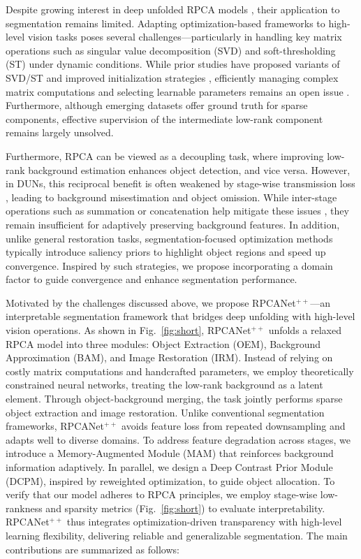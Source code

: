 \documentclass[10pt,journal,compsoc]{IEEEtran}
\begin{document}
Despite growing interest in deep unfolded RPCA models \cite{cai-2021-lrpca}, their application to segmentation remains limited. Adapting optimization-based frameworks to high-level vision tasks poses several challenges—particularly in handling key matrix operations such as singular value decomposition (SVD) and soft-thresholding (ST) under dynamic conditions. While prior studies have proposed variants of SVD/ST and improved initialization strategies \cite{jou-2024-rpca,cai-2021-lrpca}, efficiently managing complex matrix computations and selecting learnable parameters remains an open issue \cite{zhou-2023-lrsp}. Furthermore, although emerging datasets offer ground truth for sparse components, effective supervision of the intermediate low-rank component remains largely unsolved.

Furthermore, RPCA can be viewed as a decoupling task, where improving low-rank background estimation enhances object detection, and vice versa. However, in DUNs, this reciprocal benefit is often weakened by stage-wise transmission loss \cite{zhang-2023-physics}, leading to background misestimation and object omission. While inter-stage operations such as summation or concatenation help mitigate these issues \cite{zhang-2023-ctnet}, they remain insufficient for adaptively preserving background features. In addition, unlike general restoration tasks, segmentation-focused optimization methods typically introduce saliency priors \cite{dai-2017-ript} to highlight object regions and speed up convergence. Inspired by such strategies, we propose incorporating a domain factor to guide convergence and enhance segmentation performance.


Motivated by the challenges discussed above, we propose RPCANet$^{++}$—an interpretable segmentation framework that bridges deep unfolding with high-level vision operations. As shown in Fig.~\ref{fig:short}, RPCANet$^{++}$ unfolds a relaxed RPCA model into three modules: Object Extraction (OEM), Background Approximation (BAM), and Image Restoration (IRM). Instead of relying on costly matrix computations and handcrafted parameters, we employ theoretically constrained neural networks, treating the low-rank background as a latent element. Through object-background merging, the task jointly performs sparse object extraction and image restoration. Unlike conventional segmentation frameworks, RPCANet$^{++}$ avoids feature loss from repeated downsampling and adapts well to diverse domains. To address feature degradation across stages, we introduce a Memory-Augmented Module (MAM) that reinforces background information adaptively. In parallel, we design a Deep Contrast Prior Module (DCPM), inspired by reweighted optimization, to guide object allocation. To verify that our model adheres to RPCA principles, we employ stage-wise low-rankness and sparsity metrics (Fig.~\ref{fig:short}) to evaluate interpretability. RPCANet$^{++}$ thus integrates optimization-driven transparency with high-level learning flexibility, delivering reliable and generalizable segmentation. The main contributions are summarized as follows:
\end{document}
